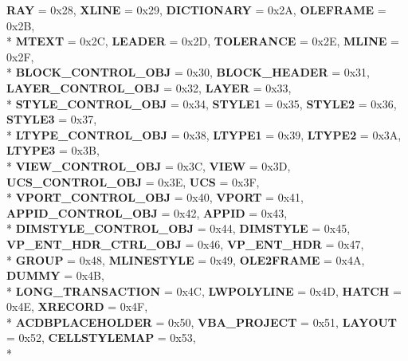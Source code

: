 \begin{DoxyCompactItemize}
{\bfseries R\+AY} = 0x28, 
{\bfseries X\+L\+I\+NE} = 0x29, 
{\bfseries D\+I\+C\+T\+I\+O\+N\+A\+RY} = 0x2A, 
{\bfseries O\+L\+E\+F\+R\+A\+ME} = 0x2B, 
\\*
{\bfseries M\+T\+E\+XT} = 0x2C, 
{\bfseries L\+E\+A\+D\+ER} = 0x2D, 
{\bfseries T\+O\+L\+E\+R\+A\+N\+CE} = 0x2E, 
{\bfseries M\+L\+I\+NE} = 0x2F, 
\\*
{\bfseries B\+L\+O\+C\+K\+\_\+\+C\+O\+N\+T\+R\+O\+L\+\_\+\+O\+BJ} = 0x30, 
{\bfseries B\+L\+O\+C\+K\+\_\+\+H\+E\+A\+D\+ER} = 0x31, 
{\bfseries L\+A\+Y\+E\+R\+\_\+\+C\+O\+N\+T\+R\+O\+L\+\_\+\+O\+BJ} = 0x32, 
{\bfseries L\+A\+Y\+ER} = 0x33, 
\\*
{\bfseries S\+T\+Y\+L\+E\+\_\+\+C\+O\+N\+T\+R\+O\+L\+\_\+\+O\+BJ} = 0x34, 
{\bfseries S\+T\+Y\+L\+E1} = 0x35, 
{\bfseries S\+T\+Y\+L\+E2} = 0x36, 
{\bfseries S\+T\+Y\+L\+E3} = 0x37, 
\\*
{\bfseries L\+T\+Y\+P\+E\+\_\+\+C\+O\+N\+T\+R\+O\+L\+\_\+\+O\+BJ} = 0x38, 
{\bfseries L\+T\+Y\+P\+E1} = 0x39, 
{\bfseries L\+T\+Y\+P\+E2} = 0x3A, 
{\bfseries L\+T\+Y\+P\+E3} = 0x3B, 
\\*
{\bfseries V\+I\+E\+W\+\_\+\+C\+O\+N\+T\+R\+O\+L\+\_\+\+O\+BJ} = 0x3C, 
{\bfseries V\+I\+EW} = 0x3D, 
{\bfseries U\+C\+S\+\_\+\+C\+O\+N\+T\+R\+O\+L\+\_\+\+O\+BJ} = 0x3E, 
{\bfseries U\+CS} = 0x3F, 
\\*
{\bfseries V\+P\+O\+R\+T\+\_\+\+C\+O\+N\+T\+R\+O\+L\+\_\+\+O\+BJ} = 0x40, 
{\bfseries V\+P\+O\+RT} = 0x41, 
{\bfseries A\+P\+P\+I\+D\+\_\+\+C\+O\+N\+T\+R\+O\+L\+\_\+\+O\+BJ} = 0x42, 
{\bfseries A\+P\+P\+ID} = 0x43, 
\\*
{\bfseries D\+I\+M\+S\+T\+Y\+L\+E\+\_\+\+C\+O\+N\+T\+R\+O\+L\+\_\+\+O\+BJ} = 0x44, 
{\bfseries D\+I\+M\+S\+T\+Y\+LE} = 0x45, 
{\bfseries V\+P\+\_\+\+E\+N\+T\+\_\+\+H\+D\+R\+\_\+\+C\+T\+R\+L\+\_\+\+O\+BJ} = 0x46, 
{\bfseries V\+P\+\_\+\+E\+N\+T\+\_\+\+H\+DR} = 0x47, 
\\*
{\bfseries G\+R\+O\+UP} = 0x48, 
{\bfseries M\+L\+I\+N\+E\+S\+T\+Y\+LE} = 0x49, 
{\bfseries O\+L\+E2\+F\+R\+A\+ME} = 0x4A, 
{\bfseries D\+U\+M\+MY} = 0x4B, 
\\*
{\bfseries L\+O\+N\+G\+\_\+\+T\+R\+A\+N\+S\+A\+C\+T\+I\+ON} = 0x4C, 
{\bfseries L\+W\+P\+O\+L\+Y\+L\+I\+NE} = 0x4D, 
{\bfseries H\+A\+T\+CH} = 0x4E, 
{\bfseries X\+R\+E\+C\+O\+RD} = 0x4F, 
\\*
{\bfseries A\+C\+D\+B\+P\+L\+A\+C\+E\+H\+O\+L\+D\+ER} = 0x50, 
{\bfseries V\+B\+A\+\_\+\+P\+R\+O\+J\+E\+CT} = 0x51, 
{\bfseries L\+A\+Y\+O\+UT} = 0x52, 
{\bfseries C\+E\+L\+L\+S\+T\+Y\+L\+E\+M\+AP} = 0x53, 
\\*

\end{DoxyCompactItemize}
